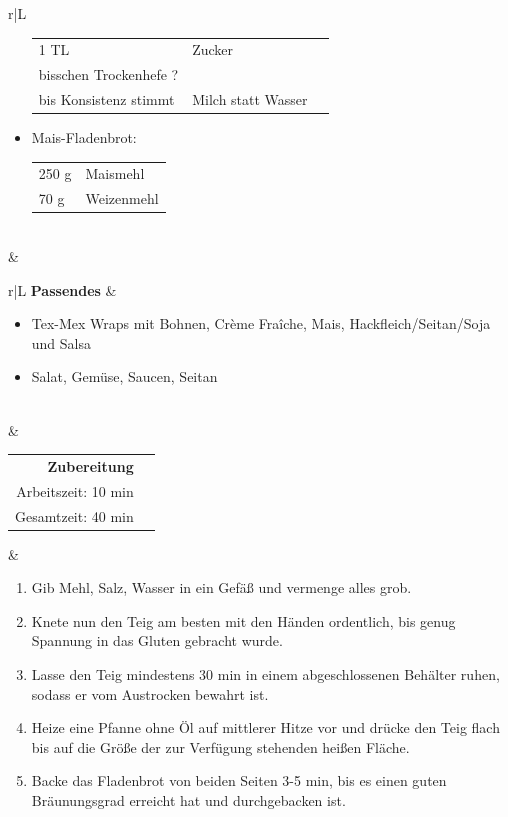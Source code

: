 \documentclass[a4paper, 12pt]{scrbook} 								%
\numberwithin{equation}{section} 									%
\begin{document}
\begin{tabularx}{\textwidth}{r|L}
\begin{itemize}[]
\begin{tabular}[t]{lll}
												1 TL & Zucker \\
												bisschen Trockenhefe ?\\
												bis Konsistenz stimmt & Milch statt Wasser \\
											\end{tabular}
											\item Mais-Fladenbrot:
											\begin{tabular}[t]{ll}
												250 g & Maismehl \\
												70 g & Weizenmehl \\
											\end{tabular} 
										\end{itemize}	\\
									&	\\

			\end{tabularx}
							\newpage

			\begin{tabularx}{\textwidth}{r|L}	
			\textbf{Passendes}		&	\begin{itemize}[]
											\item Tex-Mex Wraps mit Bohnen, Crème Fraîche, Mais, Hackfleich/Seitan/Soja und Salsa
											\item Salat, Gemüse, Saucen, Seitan 
										\end{itemize}	\\
									&	\\
										
			\begin{tabular}[t]{rr}
				\textbf{Zubereitung}	\\
				Arbeitszeit: 10 min	\\
				Gesamtzeit:	40 min		\\
			\end{tabular}			&	\begin{enumerate}[]
											\item Gib Mehl, Salz, Wasser in ein Gefäß und vermenge alles grob.
											\item Knete nun den Teig am besten mit den Händen ordentlich, bis genug Spannung in das Gluten gebracht wurde.
											\item Lasse den Teig mindestens 30 min in einem abgeschlossenen Behälter ruhen, sodass er vom Austrocken bewahrt ist.
											\item Heize eine Pfanne ohne Öl auf mittlerer Hitze vor und drücke den Teig flach bis auf die Größe der zur Verfügung stehenden heißen Fläche.
											\item Backe das Fladenbrot von beiden Seiten 3-5 min, bis es einen guten Bräunungsgrad erreicht hat und durchgebacken ist.
										\end{enumerate}	\\
		\end{tabularx}
\end{document}
